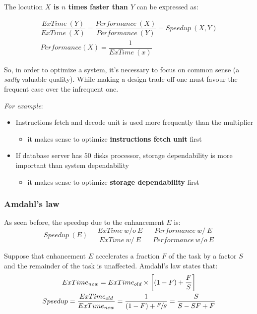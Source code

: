 \documentclass[english]{article}
\begin{document}
\bigskip
The locution \textbf{\(X\) is \(n\) times faster than \(Y\)} can be expressed as:

\begin{gather*}
  \dfrac{ExTime\ (Y)}{ExTime\ (X)}  = \dfrac{Performance\ (X)}{Performance\ (Y)} = Speedup\ (X, Y) \\
  Performance(X) = \dfrac{1}{ExTime\ (x)}
\end{gather*}

So, in order to optimize a system, it's necessary to focus on common sense (a \textit{sadly} valuable quality).
While making a design trade-off one must favour the frequent case over the infrequent one.

\textit{For example}:
\begin{itemize}
  \item Instructions fetch and decode unit is used more frequently than the multiplier
        \begin{itemize}
          \item it makes sense to optimize \textbf{instructions fetch unit} first
        \end{itemize}
  \item If database server has \(50\) disks processor, storage dependability is more important than system dependability
        \begin{itemize}
          \item it makes sense to optimize \textbf{storage dependability} first
        \end{itemize}
\end{itemize}

\subsubsection{Amdahl's law}

As seen before, the speedup due to the enhancement \(E\) is:
\[ Speedup\ (E)  = \dfrac{ExTime\ w/o\ E}{ExTime\ w/\ E} = \dfrac{Performance\ w/\ E}{Performance\ w/o\ E} \]

Suppose that enhancement \(E\) accelerates a fraction \(F\) of the task by a factor \(S\) and the remainder of the task is unaffected.
Amdahl's law states that:
\begin{gather*}
  ExTime_{new} = ExTime_{old} \times \left[\left(1 - F\right) + \dfrac{F}{S}\right] \\
  Speedup = \dfrac{ExTime_{old}}{ExTime_{new}} = \dfrac{1}{(1 - F) + \sfrac{F}{S}} = \dfrac{S}{S - SF + F}
\end{gather*}
\end{document}
